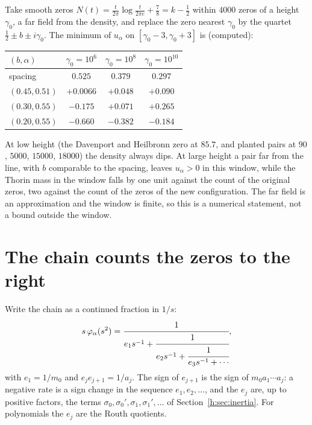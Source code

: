 \begin{computation}\label{h:comp:dipolehigh}
Take smooth zeros $N(t)=\frac{t}{2\pi}\log\frac{t}{2\pi e}+\frac78=k-\frac12$ within $4000$ zeros of a height $\gamma_0$, a far field from the density, and replace the zero nearest $\gamma_0$ by the quartet $\frac12\pm b\pm i\gamma_0$. The minimum of $u_\alpha$ on $[\gamma_0-3,\gamma_0+3]$ is (computed):
\begin{center}\small
\begin{tabular}{@{}lccc@{}}
\toprule
$(b,\alpha)$ & $\gamma_0=10^6$ & $\gamma_0=10^8$ & $\gamma_0=10^{10}$\\
\midrule
spacing & $0.525$ & $0.379$ & $0.297$\\
$(0.45,0.51)$ & $+0.0066$ & $+0.048$ & $+0.090$\\
$(0.30,0.55)$ & $-0.175$ & $+0.071$ & $+0.265$\\
$(0.20,0.55)$ & $-0.660$ & $-0.382$ & $-0.184$\\
\bottomrule
\end{tabular}
\end{center}
At low height (the Davenport and Heilbronn zero at $85.7$, and planted pairs at $90$, $5000$, $15000$, $18000$) the density always dips. At large height a pair far from the line, with $b$ comparable to the spacing, leaves $u_\alpha>0$ in this window, while the Thorin mass in the window falls by one unit against the count of the original zeros, two against the count of the zeros of the new configuration. The far field is an approximation and the window is finite, so this is a numerical statement, not a bound outside the window. %
\end{computation}

\section{The chain counts the zeros to the right}\label{h:sec:count}

Write the chain as a continued fraction in $1/s$:
\[
s\,\varphi_\alpha(s^2)=\cfrac{1}{e_1s^{-1}+\cfrac{1}{e_2s^{-1}+\cfrac{1}{e_3s^{-1}+\cdots}}},
\]
with $e_1=1/m_0$ and $e_je_{j+1}=1/a_j$. The sign of $e_{j+1}$ is the sign of $m_0a_1\cdots a_j$: a negative rate is a sign change in the sequence $e_1,e_2,\dots$, and the $e_j$ are, up to positive factors, the terms $\sigma_0,\sigma_0',\sigma_1,\sigma_1',\dots$ of Section~\ref{h:sec:inertia}. For polynomials the $e_j$ are the Routh quotients.

